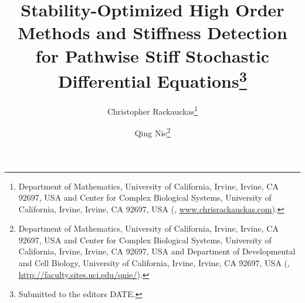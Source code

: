 

\usepackage{lipsum}
\usepackage{amsfonts}
\usepackage{graphicx}
\usepackage{epstopdf}
\usepackage{algorithmic}
\ifpdf
\else
\fi

\newcommand{\creflastconjunction}{, and~}



\title{Stability-Optimized High Order Methods and Stiffness Detection for
	Pathwise Stiff Stochastic Differential Equations\thanks{Submitted to the editors DATE.
}}

\author{Christopher Rackauckas\thanks{Department of Mathematics, University of California, Irvine, Irvine,
		CA 92697, USA and Center for Complex Biological Systems, University
		of California, Irvine, Irvine, CA 92697, USA (, \url{www.chrisrackauckas.com}).}
\and Qing Nie\thanks{Department of Mathematics, University of California, Irvine, Irvine,
	CA 92697, USA and Center for Complex Biological Systems, University
	of California, Irvine, Irvine, CA 92697, USA and Department of Developmental
	and Cell Biology, University of California, Irvine, Irvine, CA 92697,
	USA (, \url{http://faculty.sites.uci.edu/qnie/}).}}

\usepackage{amsopn}
\DeclareMathOperator{\diag}{diag}



